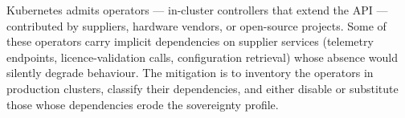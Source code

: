 \begin{pitfallbox}
\noindent Kubernetes admits operators --- in-cluster controllers
that extend the API --- contributed by suppliers, hardware vendors,
or open-source projects. Some of these operators carry implicit
dependencies on supplier services (telemetry endpoints,
licence-validation calls, configuration retrieval) whose absence
would silently degrade behaviour. The mitigation is to inventory
the operators in production clusters, classify their dependencies,
and either disable or substitute those whose dependencies erode the
sovereignty profile.
\end{pitfallbox}
